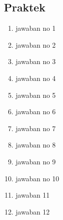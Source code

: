 \subsection{Praktek}
\begin{enumerate}
    \item jawaban no 1
 

    \item jawaban no 2
 

    \item jawaban no 3
 

    \item jawaban no 4
 

    \item jawaban no 5
 

    \item jawaban no 6
 

    \item jawaban no 7
 

    \item jawaban no 8
 

    \item jawaban no 9
 

    \item jawaban no 10
 

    \item jawaban 11
 
 \item jawaban 12
 
\end{enumerate}

